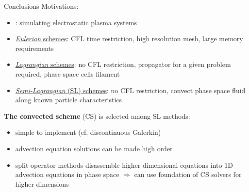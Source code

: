 \documentclass{beamer}
\begin{document}
\begin{frame}{Conclusions}
Motivations: 
    \begin{itemize}
    \item {}: simulating electrostatic plasma systems
    \item \underline{\emph{Eulerian} schemes}: CFL time restriction, high resolution mesh, large memory requirements
    \item \underline{\emph{Lagrangian} schemes}: no CFL restriction, propagator for a given problem required, phase space cells filament
    \item \underline{\emph{Semi-Lagrangian} (SL) schemes}: no CFL restriction, convect phase space fluid along known particle characteristics
    \end{itemize}
\textbf{The convected scheme} (CS) is selected among SL methods:
    \begin{itemize}
    \item simple to implement (cf. discontinuous Galerkin) 
    \item advection equation solutions can be made high order 
    \item split operator methods disassemble higher dimensional equations into 1D advection equations in phase space $\Rightarrow$ can use foundation of CS solvers for higher dimensions
    \end{itemize}

\end{frame}
\end{document}
